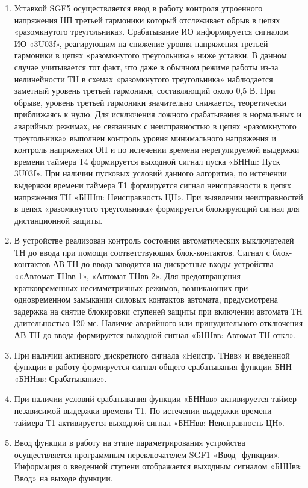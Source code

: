 \begin{enumerate}
\item
Уставкой SGF5 осуществляется ввод в работу контроля утроенного напряжения НП третьей гармоники который отслеживает обрыв в цепях «разомкнутого треугольника». Срабатывание ИО информируется сигналом ИО «3U03f», реагирующим на снижение уровня напряжения третьей гармоники в цепях «разомкнутого треугольника» ниже уставки. В данном случае учитывается тот факт, что даже в обычном режиме работы из-за нелинейности ТН в схемах «разомкнутого треугольника» наблюдается заметный уровень третьей гармоники, составляющий около 0,5 В. При обрыве, уровень третьей гармоники значительно снижается, теоретически приближаясь к нулю. Для исключения ложного срабатывания в нормальных и аварийных режимах, не связанных с неисправностью в цепях «разомкнутого треугольника» выполнен контроль уровня минимального напряжения и контроль напряжения ОП и по истечении времени нерегулируемой выдержки времени таймера Т4 формируется выходной сигнал пуска «БННш: Пуск 3U03f». При наличии пусковых условий данного алгоритма, по истечении выдержки времени таймера Т1 формируется сигнал неисправности в цепях напряжения ТН «БННш: Неисправность ЦН». При выявлении неисправностей в цепях «разомкнутого треугольника» формируется блокирующий сигнал для дистанционной защиты.

\item
В устройстве реализован контроль состояния автоматических выключателей ТН до ввода при помощи соответствующих блок-контактов. Сигнал с блок-контактов АВ ТН до ввода заводится на дискретные входы устройства ««Автомат ТНвв 1», «Автомат ТНвв 2». Для предотвращения кратковременных несимметричных режимов,  возникающих  при одновременном  замыкании  силовых  контактов  автомата,  предусмотрена задержка  на  снятие  блокировки  ступеней  защиты  при  включении  автомата  ТН  длительностью  120  мс. Наличие  аварийного  или  принудительного  отключения  АВ  ТН  до  ввода  формируется  выходной  сигнал «БННвв: Автомат ТН откл».

\item
При  наличии  активного  дискретного  сигнала  «Неиспр.  ТНвв»  и  введенной  функции  в  работу формируется сигнал общего срабатывания функции БНН «БННвв: Срабатывание». 

\item
При наличии условий срабатывания функции «БННвв» активируется таймер независимой выдержки времени Т1. По истечении выдержки времени таймера Т1 активируется выходной сигнал «БННвв: Неисправность ЦН».

\item
Ввод функции в работу на этапе параметрирования устройства осуществляется программным переключателем SGF1 «Ввод\_функции». Информация о введенной ступени отображается выходным сигналом «БННвв: Ввод» на выходе функции.


\end{enumerate}
